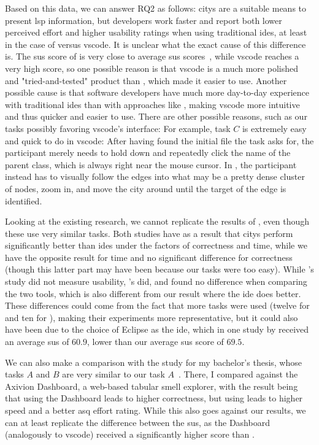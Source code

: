 \documentclass[../thesis]{subfiles}
\begin{document}
Based on this data, we can answer \textsf{RQ2} as follows:
\Glspl{city} are a suitable means to present \gls{lsp} information, but developers work faster and report both lower perceived effort and higher usability ratings when using traditional \glspl{ide}, at least in the case of \SEE{} versus \gls{vscode}.
It is unclear what the exact cause of this difference is.
The \gls{sus} score of \SEE{} is very close to average \gls{sus} scores~\cite{sauro2013}, while \gls{vscode} reaches a very high score, so one possible reason is that \gls{vscode} is a much more polished and "tried-and-tested" product than \SEE{}, which made it easier to use.
Another possible cause is that software developers have much more day-to-day experience with traditional \glspl{ide} than with approaches like \SEE{}, making \gls{vscode} more intuitive and thus quicker and easier to use.
There are other possible reasons, such as our tasks possibly favoring \gls{vscode}'s interface:
For example, task $C$ is extremely easy and quick to do in \gls{vscode}:
After having found the initial file the task asks for, the participant merely needs to hold down  and repeatedly click the name of the parent class, which is always right near the mouse cursor.
In \SEE{}, the participant instead has to visually follow the edges into what may be a pretty dense cluster of nodes, zoom in, and move the city around until the target of the edge is identified.

Looking at the existing research, we cannot replicate the results of \textcite{wettel2011,romano2019}, even though these use very similar tasks.
Both studies have as a result that \glspl{city} perform significantly better than \glspl{ide} under the factors of correctness and time, while we have the opposite result for time and no significant difference for correctness (though this latter part may have been because our tasks were too easy).
While \citeauthor{wettel2011}'s study did not measure usability, \citeauthor{romano2019}'s did, and found no difference when comparing the two tools, which is also different from our result where the \gls{ide} does better.
These differences could come from the fact that more tasks were used (twelve for \citeauthor{wettel2011} and ten for \citeauthor{romano2019}), making their experiments more representative, but it could also have been due to the choice of Eclipse as the \gls{ide}, which in one study by \textcite{morales2019} received an average \gls{sus} of $60.9$, lower than our average \SEE{} \gls{sus} score of $69.5$.

We can also make a comparison with the study for my bachelor's thesis, whose tasks $A$ and $B$ are very similar to our task $A$~\cite{galperin2022}.
There, I compared \SEE{} against the Axivion Dashboard, a web-based tabular \gls{smell} explorer, with the result being that using the Dashboard leads to higher correctness, but using \SEE{} leads to higher speed and a better \gls{asq} effort rating.
While this also goes against our results, we can at least replicate the difference between the \gls{sus}, as the Dashboard (analogously to \gls{vscode}) received a significantly higher score than \SEE{}.
\end{document}

